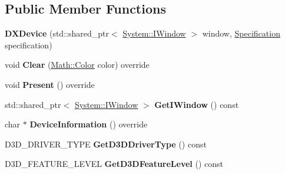 \subsection*{Public Member Functions}
\begin{DoxyCompactItemize}
\item 
\hypertarget{class_jade_1_1_graphics_1_1_d_x_device_a031022799d9bbac527499a95efab547a}{}{\bfseries D\+X\+Device} (std\+::shared\+\_\+ptr$<$ \hyperlink{struct_jade_1_1_system_1_1_i_window}{System\+::\+I\+Window} $>$ window, \hyperlink{struct_jade_1_1_graphics_1_1_specification}{Specification} specification)\label{class_jade_1_1_graphics_1_1_d_x_device_a031022799d9bbac527499a95efab547a}

\item 
\hypertarget{class_jade_1_1_graphics_1_1_d_x_device_a678268abc9109caf345758ffddbc870e}{}void {\bfseries Clear} (\hyperlink{struct_jade_1_1_math_1_1_color}{Math\+::\+Color} color) override\label{class_jade_1_1_graphics_1_1_d_x_device_a678268abc9109caf345758ffddbc870e}

\item 
\hypertarget{class_jade_1_1_graphics_1_1_d_x_device_ab83fb7101bfcc38b19704f6b850c1434}{}void {\bfseries Present} () override\label{class_jade_1_1_graphics_1_1_d_x_device_ab83fb7101bfcc38b19704f6b850c1434}

\item 
\hypertarget{class_jade_1_1_graphics_1_1_d_x_device_ad65444a0d5889c5978009e6a93f3f8a9}{}std\+::shared\+\_\+ptr$<$ \hyperlink{struct_jade_1_1_system_1_1_i_window}{System\+::\+I\+Window} $>$ {\bfseries Get\+I\+Window} () const \label{class_jade_1_1_graphics_1_1_d_x_device_ad65444a0d5889c5978009e6a93f3f8a9}

\item 
\hypertarget{class_jade_1_1_graphics_1_1_d_x_device_ae4639aba17abed31391aac0b35bcc9c2}{}char $\ast$ {\bfseries Device\+Information} () override\label{class_jade_1_1_graphics_1_1_d_x_device_ae4639aba17abed31391aac0b35bcc9c2}

\item 
\hypertarget{class_jade_1_1_graphics_1_1_d_x_device_ac61ddfb2138903d71cb92384aa8c58b7}{}D3\+D\+\_\+\+D\+R\+I\+V\+E\+R\+\_\+\+T\+Y\+P\+E {\bfseries Get\+D3\+D\+Driver\+Type} () const \label{class_jade_1_1_graphics_1_1_d_x_device_ac61ddfb2138903d71cb92384aa8c58b7}

\item 
\hypertarget{class_jade_1_1_graphics_1_1_d_x_device_a6fdda6e019340bf83c328cfcb36a58fb}{}D3\+D\+\_\+\+F\+E\+A\+T\+U\+R\+E\+\_\+\+L\+E\+V\+E\+L {\bfseries Get\+D3\+D\+Feature\+Level} () const \label{class_jade_1_1_graphics_1_1_d_x_device_a6fdda6e019340bf83c328cfcb36a58fb}


\end{DoxyCompactItemize}
